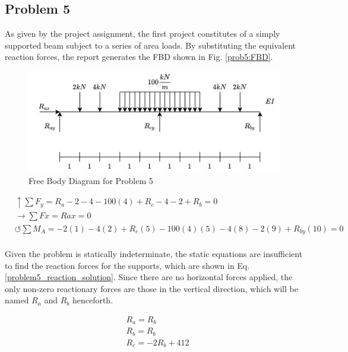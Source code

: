 \documentclass[a4paper]{article}
\begin{document}
\subsection{Problem 5}

As given by the project assignment, the first project constitutes of a simply supported beam subject to a series of area loads. By substituting the equivalent reaction forces, the report generates the FBD shown in Fig. \ref{prob5:FBD}.

\begin{figure}[h]
\includegraphics[width=\textwidth]{FBD/FBD_5.jpg}
\caption{Free Body Diagram for Problem 5}
\label{FBD_5}
\end{figure}

\begin{equation}
\begin{split}
    &\uparrow \sum F_y = R_a - 2 - 4 - 100(4) + R_c -4 -2 + R_b = 0 \\
     &\rightarrow \sum Fx = R{ax} = 0 \\
     &\circlearrowleft \sum M_A = -2(1) - 4(2) + R_c(5) -100(4)(5) - 4(8) - 2(9) + R_{by}(10) = 0 \\
\end{split}
\label{problem5_reaction_equation}
\end{equation}

Given the problem is statically indeterminate, the static equations are insufficient to find the reaction forces for the supports, which are shown in Eq. \ref{problem5_reaction_solution}. Since there are no horizontal forces applied, the only non-zero reactionary forces are those in the vertical direction, which will be named $R_a$ and $R_b$ henceforth.

\begin{equation}
\begin{split}
    & R_a = R_b \\
    & R_b = R_b \\
    & R_c = -2R_b + 412 \\
\end{split}
\label{problem5_reaction_solution}
\end{equation}
\end{document}
